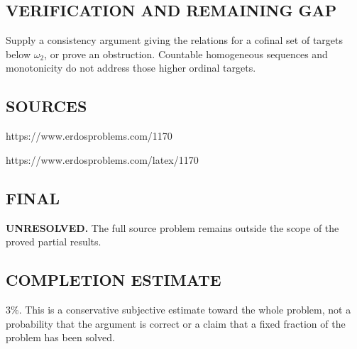 \subsection*{VERIFICATION AND REMAINING GAP}
Supply a consistency argument giving the relations for a cofinal set of
targets below $\omega_2$, or prove an obstruction. Countable homogeneous
sequences and monotonicity do not address those higher ordinal targets.

\subsection*{SOURCES}
https://www.erdosproblems.com/1170

https://www.erdosproblems.com/latex/1170

\subsection*{FINAL}
\textbf{UNRESOLVED.} The full source problem remains outside the scope of the proved partial results.

\subsection*{COMPLETION ESTIMATE}
$3\%$. This is a conservative subjective estimate toward the whole problem, not a probability that the argument is correct or a claim that a fixed fraction of the problem has been solved.
